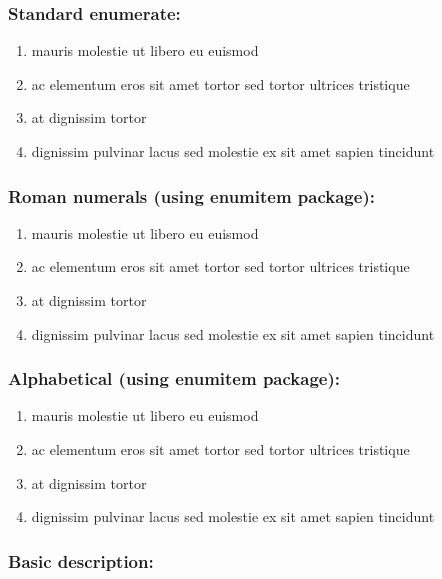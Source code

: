 \documentclass[a4paper,10pt]{article}
\begin{document}
\subsubsection*{Standard enumerate:}

\begin{enumerate}
  \item mauris molestie ut libero eu euismod
  \item ac elementum eros sit amet tortor sed tortor ultrices tristique
  \item at dignissim tortor
  \item dignissim pulvinar lacus sed molestie ex sit amet sapien tincidunt
\end{enumerate}

\subsubsection*{Roman numerals (using enumitem package):}

\begin{enumerate}[label=(\roman*)]
  \item mauris molestie ut libero eu euismod
  \item ac elementum eros sit amet tortor sed tortor ultrices tristique
  \item at dignissim tortor
  \item dignissim pulvinar lacus sed molestie ex sit amet sapien tincidunt
\end{enumerate}

\subsubsection*{Alphabetical (using enumitem package):}

\begin{enumerate}[label=\alph*)]
  \item mauris molestie ut libero eu euismod
  \item ac elementum eros sit amet tortor sed tortor ultrices tristique
  \item at dignissim tortor
  \item dignissim pulvinar lacus sed molestie ex sit amet sapien tincidunt
\end{enumerate}

\subsubsection*{Basic description:}
\end{document}
